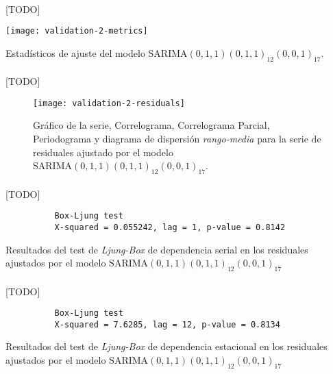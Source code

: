 \documentclass[a4paper, spanish]{article}
\begin{document}
      \paragraph{}
      [TODO]

      \begin{table}[htb!]
        \centering
        \texttt{[image: validation-2-metrics]}
        \caption{Estadísticos de ajuste del modelo $\text{SARIMA}(0, 1, 1)(0, 1, 1)_{12}(0, 0, 1)_{17}$.}
        \label{img:validation_2_metrics}
      \end{table}

      \paragraph{}
      [TODO]

      \begin{figure}[htb!]
        \centering
        \texttt{[image: validation-2-residuals]}
        \caption{Gráfico de la serie, Correlograma, Correlograma Parcial, Periodograma y diagrama de dispersión \emph{rango-media} para la serie de residuales ajustado por el modelo $\text{SARIMA}(0, 1, 1)(0, 1, 1)_{12}(0, 0, 1)_{17}$.}
        \label{img:validation_2_residuals}
      \end{figure}

      \paragraph{}
      [TODO]

      \begin{table}
        \begin{Verbatim}
          Box-Ljung test
          X-squared = 0.055242, lag = 1, p-value = 0.8142
        \end{Verbatim}
        \caption{Resultados del test de \emph{Ljung-Box} de dependencia serial en los residuales ajustados por el modelo $\text{SARIMA}(0, 1, 1)(0, 1, 1)_{12}(0, 0, 1)_{17}$}
        \label{result:comparison_2_ljung_box_1}
      \end{table}

      \paragraph{}
      [TODO]

      \begin{table}
        \begin{Verbatim}
          Box-Ljung test
          X-squared = 7.6285, lag = 12, p-value = 0.8134
        \end{Verbatim}
        \caption{Resultados del test de \emph{Ljung-Box} de dependencia estacional en los residuales ajustados por el modelo $\text{SARIMA}(0, 1, 1)(0, 1, 1)_{12}(0, 0, 1)_{17}$}
        \label{result:comparison_2_ljung_box_12}
      \end{table}
\end{document}
